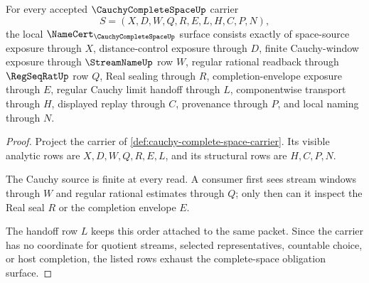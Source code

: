 \begin{theorem}
\label{thm:cauchy-complete-space-namecert-obligations}
For every accepted $\CauchyCompleteSpaceUp$ carrier
$$
S=(X,D,W,Q,R,E,L,H,C,P,N),
$$
the local $\NameCert_{\CauchyCompleteSpaceUp}$ surface consists exactly of space-source exposure through $X$, distance-control exposure through $D$, finite Cauchy-window exposure through $\StreamNameUp$ row $W$, regular rational readback through $\RegSeqRatUp$ row $Q$, Real sealing through $R$, completion-envelope exposure through $E$, regular Cauchy limit handoff through $L$, componentwise transport through $H$, displayed replay through $C$, provenance through $P$, and local naming through $N$.
\end{theorem}
\begin{proof}
Project the carrier of \autoref{def:cauchy-complete-space-carrier}. Its visible analytic rows are $X,D,W,Q,R,E,L$, and its structural rows are $H,C,P,N$.

The Cauchy source is finite at every read. A consumer first sees stream windows through $W$ and regular rational estimates through $Q$; only then can it inspect the Real seal $R$ or the completion envelope $E$.

The handoff row $L$ keeps this order attached to the same packet. Since the carrier has no coordinate for quotient streams, selected representatives, countable choice, or host completion, the listed rows exhaust the complete-space obligation surface.
\end{proof}


